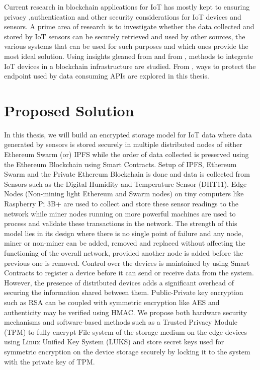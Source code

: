 \documentclass[11pt,openright]{report}
\begin{document}
Current research in blockchain applications for IoT has mostly kept to ensuring privacy ,authentication and other security considerations \cite{8012302} for IoT devices and sensors. A prime area of research is to investigate whether the data collected and stored by IoT sensors can be securely retrieved and used by other sources, the various systems that can be used for such purposes and which ones provide the most ideal solution. Using insights gleaned from \cite{8094378} and from \cite{8634961}, methods to integrate IoT devices in a blockchain infrastructure are studied. From  \cite{8644498}, ways to protect the endpoint used by data consuming APIs are explored in this thesis.

\section{Proposed Solution}\label{section:proposed_solution}
In this thesis, we will build an encrypted storage model for IoT data where data generated by sensors is stored securely in multiple distributed nodes of either Ethereum Swarm (or) IPFS while the order of data collected is preserved using the Ethereum Blockchain using Smart Contracts. Setup of IPFS, Ethereum Swarm and the Private Ethereum Blockchain is done and data is collected from Sensors such as the Digital Humidity and Temperature Sensor (DHT11). Edge Nodes (Non-mining light Ethereum and Swarm nodes) on tiny computers like Raspberry Pi 3B+ are used to collect and store these sensor readings to the network while miner nodes running on more powerful machines are used to process and validate these transactions in the network. The strength of this model lies in its design where there is no single point of failure and any node, miner or non-miner can be added, removed and replaced without affecting the functioning of the overall  network, provided another node is added before the previous one is removed. Control over the devices is maintained by using Smart Contracts to register a device \cite{zhang2018smart} before it can send or receive data from the system. However, the presence of distributed devices adds a significant overhead of securing the information shared between them. Public-Private key encryption such as RSA can be coupled with symmetric encryption like AES and authenticity may be verified using HMAC. We propose both hardware security mechanisms and software-based methods such as a Trusted Privacy Module (TPM) to fully encrypt File system of the storage medium on the edge devices using Linux Unified Key System (LUKS) and store secret keys used for symmetric encryption on the device storage securely by locking it to the system with the private key of TPM.
\end{document}
